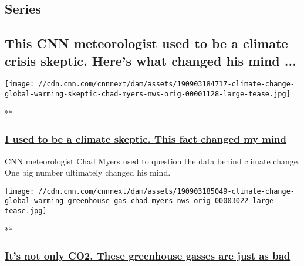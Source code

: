 \hypertarget{series-}{%
\subsection{Series~}\label{series-}}

\hypertarget{this-cnn-meteorologist-used-to-be-a-climate-crisis-skeptic-heres-what-changed-his-mind-}{%
\subsection{This CNN meteorologist used to be a climate crisis skeptic.
Here's what changed his mind
...}\label{this-cnn-meteorologist-used-to-be-a-climate-crisis-skeptic-heres-what-changed-his-mind-}}

\href{/videos/weather/2019/09/03/climate-change-global-warming-skeptic-chad-myers-nws-orig.cnn}{}

\texttt{[image: //cdn.cnn.com/cnnnext/dam/assets/190903184717-climate-change-global-warming-skeptic-chad-myers-nws-orig-00001128-large-tease.jpg]}

**

\hypertarget{i-used-to-be-a-climate-skeptic-this-fact-changed-my-mind}{%
\subsubsection{\texorpdfstring{\href{/videos/weather/2019/09/03/climate-change-global-warming-skeptic-chad-myers-nws-orig.cnn}{I
used to be a climate skeptic. This fact changed my
mind}}{I used to be a climate skeptic. This fact changed my mind}}\label{i-used-to-be-a-climate-skeptic-this-fact-changed-my-mind}}

CNN meteorologist Chad Myers used to question the data behind climate
change. One big number ultimately changed his mind.

\href{/videos/weather/2019/09/03/climate-change-global-warming-greenhouse-gas-chad-myers-nws-orig.cnn}{}

\texttt{[image: //cdn.cnn.com/cnnnext/dam/assets/190903185049-climate-change-global-warming-greenhouse-gas-chad-myers-nws-orig-00003022-large-tease.jpg]}

**

\hypertarget{its-not-only-co2-these-greenhouse-gasses-are-just-as-bad}{%
\subsubsection{\texorpdfstring{\href{/videos/weather/2019/09/03/climate-change-global-warming-greenhouse-gas-chad-myers-nws-orig.cnn}{It's
not only CO2. These greenhouse gasses are just as
bad}}{It's not only CO2. These greenhouse gasses are just as bad}}\label{its-not-only-co2-these-greenhouse-gasses-are-just-as-bad}}

